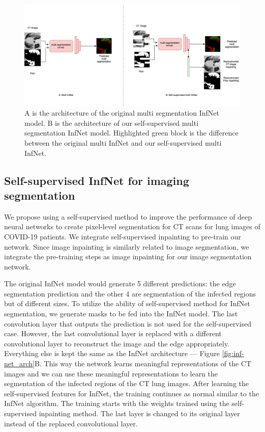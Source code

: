 \begin{figure}
	\centering
	\includegraphics[width=\linewidth]{self-super-multi-inf-net.png}
	\caption{A is the architecture of the original multi segmentation InfNet model. B is the architecture of our self-supervised multi segmentation InfNet model. Highlighted green block is the difference between the original multi InfNet and our self-supervised multi InfNet.}
	\label{fig:multi-inf-net_arch}
\end{figure}

\subsection{Self-supervised InfNet for imaging segmentation}

We propose using a self-supervised method to improve the performance of deep neural networks to create pixel-level segmentation for CT scans for lung images of COVID-19 patients. We integrate self-supervised inpainting to pre-train our network. Since image inpainting is similarly related to image segmentation, we integrate the pre-training steps as image inpainting for our image segmentation network. 

The original InfNet model would generate 5 different predictions: the edge segmentation prediction and the other 4 are segmentation of the infected regions but of different sizes. To utilize the ability of self-supervised method for InfNet segmentation, we generate masks to be fed into the InfNet model. The last convolution layer that outputs the prediction is not used for the self-supervised case. However, the last convolutional layer is replaced with a different convolutional layer to reconstruct the image and the edge appropriately. Everything else is kept the same as the InfNet architecture --- Figure \ref{fig:inf-net_arch}B. This way the network learns meaningful representations of the CT images and we can use these meaningful representations to learn the segmentation of the infected regions of the CT lung images. After learning the self-supervised features for InfNet, the training continues as normal similar to the InfNet algorithm. The training starts with the weights trained using the self-supervised inpainting method. The last layer is changed to its original layer instead of the replaced convolutional layer. 

